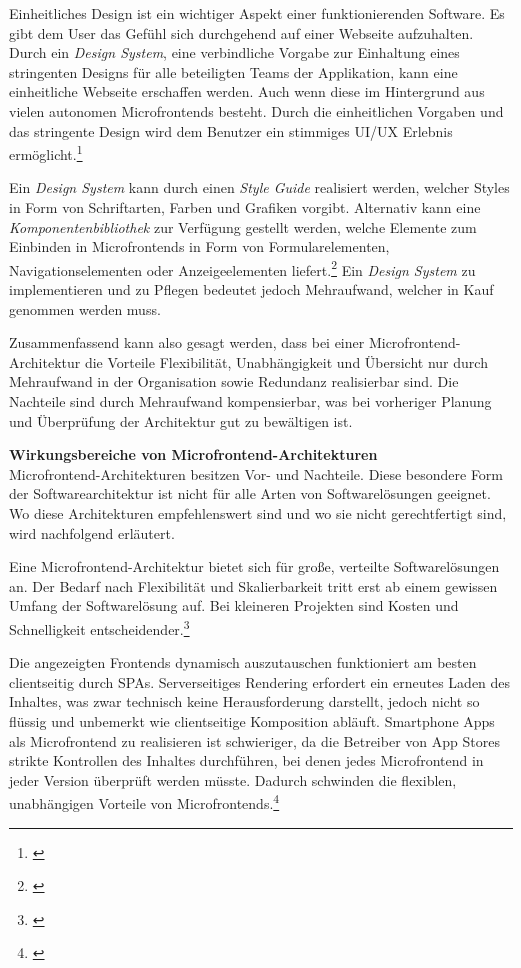 Einheitliches Design ist ein wichtiger Aspekt einer funktionierenden Software. Es gibt dem User das Gefühl sich durchgehend auf einer Webseite aufzuhalten. Durch ein \textit{Design System}, eine verbindliche Vorgabe zur Einhaltung eines stringenten Designs für alle beteiligten Teams der Applikation, kann eine einheitliche Webseite erschaffen werden. Auch wenn diese im Hintergrund aus vielen autonomen Microfrontends besteht. Durch die einheitlichen Vorgaben und das stringente Design wird dem Benutzer ein stimmiges \gls{UI}/\gls{UX} Erlebnis ermöglicht.\footnote{\cite[vgl.][214\psqq]{Geers2020}}

Ein \textit{Design System} kann durch einen \textit{Style Guide} realisiert werden, welcher Styles in Form von Schriftarten, Farben und Grafiken vorgibt. Alternativ kann eine \textit{Komponentenbibliothek} zur Verfügung gestellt werden, welche Elemente zum Einbinden in Microfrontends in Form von Formularelementen, Navigationselementen oder Anzeigeelementen liefert.\footnote{\cite[vgl.][215]{Geers2020}} Ein \textit{Design System} zu implementieren und zu Pflegen bedeutet jedoch Mehraufwand, welcher in Kauf genommen werden muss.

Zusammenfassend kann also gesagt werden, dass bei einer Microfrontend-Architektur die Vorteile Flexibilität, Unabhängigkeit und Übersicht nur durch Mehraufwand in der Organisation sowie Redundanz realisierbar sind. Die Nachteile sind durch Mehraufwand kompensierbar, was bei vorheriger Planung und Überprüfung der Architektur gut zu bewältigen ist.

\textbf{Wirkungsbereiche von Microfrontend-Architekturen}\\    
Microfrontend-Architekturen besitzen Vor- und Nachteile. Diese besondere Form der Softwarearchitektur ist nicht für alle Arten von Softwarelösungen geeignet. Wo diese Architekturen empfehlenswert sind und wo sie nicht gerechtfertigt sind, wird nachfolgend erläutert.

Eine Microfrontend-Architektur bietet sich für große, verteilte Softwarelösungen an. Der Bedarf nach Flexibilität und Skalierbarkeit tritt erst ab einem gewissen Umfang der Softwarelösung auf. Bei kleineren Projekten sind Kosten und Schnelligkeit entscheidender.\footnote{\cite[vgl.][19]{Geers2020}}

Die angezeigten Frontends dynamisch auszutauschen funktioniert am besten clientseitig durch \gls{SPA}s. Serverseitiges Rendering erfordert ein erneutes Laden des Inhaltes, was zwar technisch keine Herausforderung darstellt, jedoch nicht so flüssig und unbemerkt wie clientseitige Komposition abläuft. Smartphone Apps als Microfrontend zu realisieren ist schwieriger, da die Betreiber von App Stores strikte Kontrollen des Inhaltes durchführen, bei denen jedes Microfrontend in jeder Version überprüft werden müsste. Dadurch schwinden die flexiblen, unabhängigen Vorteile von Microfrontends.\footnote{\cite[vgl.][19\psq]{Geers2020}}

